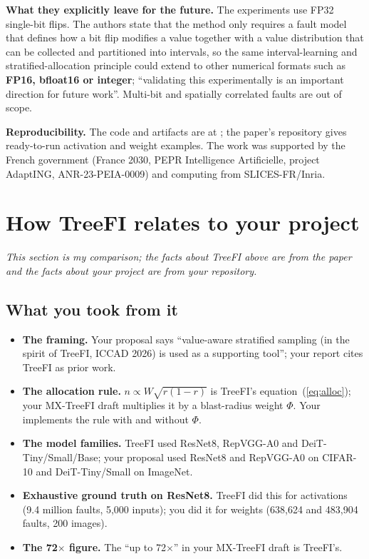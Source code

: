 \textbf{What they explicitly leave for the future.} The experiments use FP32 single-bit flips. The authors state that the method only requires a fault model that defines how a bit flip modifies a value together with a value distribution that can be collected and partitioned into intervals, so the same interval-learning and
stratified-allocation principle could extend to other numerical formats such as \textbf{FP16, bfloat16 or integer}; ``validating this experimentally is an important direction for future work''. Multi-bit and spatially correlated faults are out of scope.

\textbf{Reproducibility.} The code and artifacts are at ; the paper's repository gives ready-to-run activation and weight examples. The work was supported by the French government (France 2030, PEPR Intelligence Artificielle, project AdaptING, ANR-23-PEIA-0009) and computing from SLICES-FR/Inria.

\section{How TreeFI relates to your project}
\emph{This section is my comparison; the facts about TreeFI above are from the paper and the facts about your project are from your repository.}

\subsection{What you took from it}
\begin{itemize}
\item \textbf{The framing.} Your proposal says ``value-aware stratified sampling (in the spirit of TreeFI, ICCAD 2026) is used as a supporting tool''; your report cites TreeFI as prior work.
\item \textbf{The allocation rule.} $n\propto W\sqrt{r(1-r)}$ is TreeFI's equation~(\ref{eq:alloc}); your MX-TreeFI draft multiplies it by a blast-radius weight $\Phi$. Your  implements the rule with and without $\Phi$.
\item \textbf{The model families.} TreeFI used ResNet8, RepVGG-A0 and DeiT-Tiny/Small/Base; your proposal used ResNet8 and RepVGG-A0 on CIFAR-10 and DeiT-Tiny/Small on ImageNet.
\item \textbf{Exhaustive ground truth on ResNet8.} TreeFI did this for activations (9.4 million faults, 5{,}000 inputs); you did it for weights (638{,}624 and 483{,}904 faults, 200 images).
\item \textbf{The 72$\times$ figure.} The ``up to 72$\times$'' in your MX-TreeFI draft is TreeFI's.
\end{itemize}

